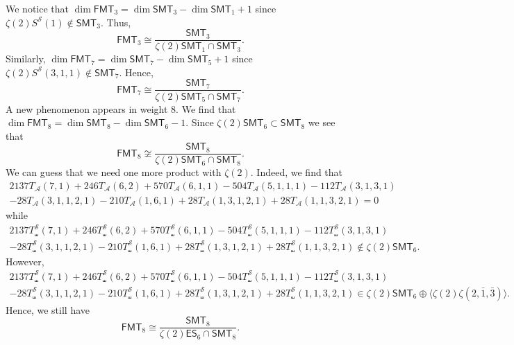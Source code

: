 \documentclass{article}
\newcommand{\FMTV}{\mathsf {FMT}}
\newcommand{\ES}{\mathsf {ES}}
\newcommand{\SMTV}{\mathsf {SMT}}
\newcommand{\sha}{\shuffle}
\newcommand{\Sy}{{\mathcal S}}
\newcommand{\calA}{\mathcal{A}}
\theoremstyle{plain}
\theoremstyle{definition}
\begin{document}
We notice that $\dim\FMTV_3=\dim\SMTV_3-\dim\SMTV_1+1$ since $\zeta(2)S^\Sy(1)\not\in \SMTV_3$. Thus,
\begin{equation*}
 \FMTV_3\cong \frac{\SMTV_3}{\zeta(2)\SMTV_1\cap \SMTV_3}.
\end{equation*}
Similarly, $\dim\FMTV_7=\dim\SMTV_7-\dim\SMTV_5+1$ since $\zeta(2)S^\Sy(3,1,1)\not\in \SMTV_7$. Hence,
\begin{equation*}
 \FMTV_7\cong \frac{\SMTV_7}{\zeta(2)\SMTV_5\cap \SMTV_7}.
\end{equation*}
A new phenomenon appears in weight 8. We find that $\dim\FMTV_8=\dim\SMTV_8-\dim\SMTV_6-1$.
Since $\zeta(2)\SMTV_6\subset \SMTV_8$ we see that
\begin{equation*}
 \FMTV_8\not \cong \frac{\SMTV_8}{\zeta(2)\SMTV_6\cap \SMTV_8}.
\end{equation*}
We can guess that we need one more product with $\zeta(2)$. Indeed, we find that
\begin{multline*}
2137T_\calA(7, 1) + 246T_\calA(6, 2) + 570T_\calA(6, 1, 1) - 504T_\calA(5, 1, 1, 1) - 112T_\calA(3, 1, 3, 1) \\
- 28T_\calA(3, 1, 1, 2, 1) - 210T_\calA(1, 6, 1) + 28T_\calA(1, 3, 1, 2, 1) + 28T_\calA(1, 1, 3, 2, 1)=0
\end{multline*}
while
\begin{multline*}
2137T_\sha^\Sy(7, 1) + 246T_\sha^\Sy(6, 2) + 570T_\sha^\Sy(6, 1, 1) - 504T_\sha^\Sy(5, 1, 1, 1) - 112T_\sha^\Sy(3, 1, 3, 1) \\
- 28T_\sha^\Sy(3, 1, 1, 2, 1) - 210T_\sha^\Sy(1, 6, 1) + 28T_\sha^\Sy(1, 3, 1, 2, 1) + 28T_\sha^\Sy(1, 1, 3, 2, 1)\not\in \zeta(2)\SMTV_6.
\end{multline*}
However,
\begin{multline*}
2137T_\sha^\Sy(7, 1) + 246T_\sha^\Sy(6, 2) + 570T_\sha^\Sy(6, 1, 1) - 504T_\sha^\Sy(5, 1, 1, 1) - 112T_\sha^\Sy(3, 1, 3, 1) \\
- 28T_\sha^\Sy(3, 1, 1, 2, 1) - 210T_\sha^\Sy(1, 6, 1) + 28T_\sha^\Sy(1, 3, 1, 2, 1) + 28T_\sha^\Sy(1, 1, 3, 2, 1) \in \zeta(2)\SMTV_6\oplus \langle \zeta(2)\zeta(2,\bar1,\bar3)\rangle.
\end{multline*}
Hence, we still have
\begin{equation*}
 \FMTV_8 \cong \frac{\SMTV_8}{\zeta(2)\ES_6\cap \SMTV_8}.
\end{equation*}
\end{document}

